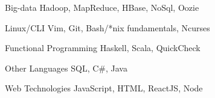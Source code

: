 

\begin{cvskills}

  \cvskill
    {Big-data}
    {Hadoop, MapReduce, HBase, NoSql, Oozie}

  \cvskill
    {Linux/CLI}
    {Vim, Git, Bash/*nix fundamentals, Ncurses}

  \cvskill
    {Functional Programming}
    {Haskell, Scala, QuickCheck}

  \cvskill
    {Other Languages}
    {SQL, C\#, Java}

  \cvskill
    {Web Technologies}
    {JavaScript, HTML, ReactJS, Node}

\end{cvskills}
